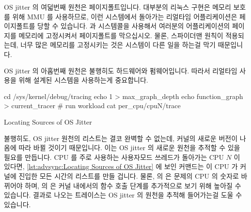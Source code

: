 \fi

OS jitter 의 여덟번째 원천은 페이지폴트입니다.
대부분의 리눅스 구현은 메모리 보호를 위해 MMU 를 사용하므로, 이런 시스템에서
돌아가는 리얼타임 어플리케이션은 페이지폴트를 당할 수 있습니다.
 과  시스템콜을 사용해서 여러분의 어플리케이션의
페이지를 메모리에 고정시켜서 페이지폴트를 막으십시오.
물론, 스파이더맨 원칙이 적용되는데, 너무 많은 메모리를 고정시키는 것은 시스템이
다른 일을 하는걸 막기 때문입니다.

OS jitter 의 아홉번째 원천은 불행히도 하드웨어와 펌웨어입니다.
따라서 리얼타임 사용을 위해 설계된 시스템을 사용하는게 중요합니다.

\begin{listing}[tb]
\begin{fcvlabel}
\begin{VerbatimL}[commandchars=\\\[\]]
cd /sys/kernel/debug/tracing
echo 1 > max_graph_depth		\lnlbl[echo1]
echo function_graph > current_tracer
# run workload
cat per_cpu/cpuN/trace			\lnlbl[cat]
\end{VerbatimL}
\end{fcvlabel}
\caption{Locating Sources of OS Jitter}
\label{lst:advsync:Locating Sources of OS Jitter}
\end{listing}

\begin{fcvref}
불행히도, OS jitter 원천의 리스트는 결코 완벽할 수 없는데, 커널의 새로운 버전이
나옴에 따라 바뀔 것이기 때문입니다.
이는 OS jitter 의 새로운 원천을 추적할 수 있을 필요를 만듭니다.
CPU 를 주로 사용하는 사용자모드 쓰레드가 돌아가는 CPU $N$ 이 있다면,
\cref{lst:advsync:Locating Sources of OS Jitter} 에 보인 커맨드는 이 CPU 가
커널에 진입한 모든 시간의 리스트를 만들 겁니다.
물론,  의  은 문제의 CPU 의 숫자로 바뀌어야 하며,
 의  은 커널 내에서의 함수 호출 단계를 추가적으로 보기 위해
높아질 수 있습니다.
결과로 나오는 트레이스는 OS jitter 의 원천을 추적해 들어가는걸 도울 수
있습니다.
\end{fcvref}

